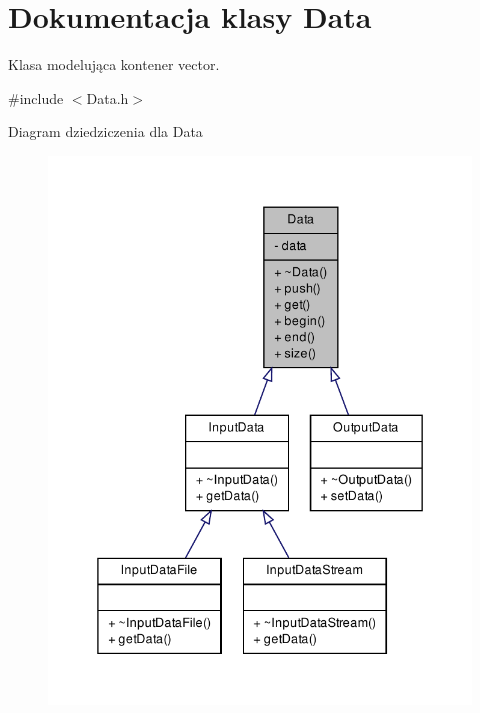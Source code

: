 \hypertarget{class_data}{\section{\-Dokumentacja klasy \-Data}
\label{class_data}
}


\-Klasa modelująca kontener vector.  




{\ttfamily \#include $<$\-Data.\-h$>$}



\-Diagram dziedziczenia dla \-Data\nopagebreak
\begin{figure}[H]
\begin{center}
\leavevmode
\includegraphics[width=338pt]{class_data__inherit__graph}
\end{center}
\end{figure}
